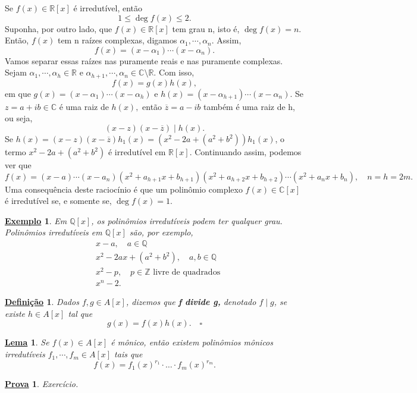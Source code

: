 \documentclass{article}
\newtheorem*{def*}{\underline{Defini\c c\~ao}}
\newtheorem*{lemma*}{\underline{Lema}}
\newtheorem{example}{\underline{Exemplo}}
\newtheorem*{proof*}{\underline{Prova}}
\begin{document}
Se \(f(x)\in \mathbb{R}[x]\) é irredutível, então 
\[
  1\leq \deg{f(x)}\leq 2.
\]
Suponha, por outro lado, que \(f(x)\in \mathbb{R}[x]\) tem grau n, isto é, \(\deg{f(x)} = n.\) Então, \(f(x)\) tem n raízes complexas,
digamos \(\alpha_{1}, \cdots, \alpha_{n}\). Assim, 
\[
  f(x) = (x-\alpha_{1})\cdots(x-\alpha_{n}).
\]
Vamos separar essas raízes nas puramente reais e nas puramente complexas. Sejam \(\alpha_{1}, \cdots, \alpha_{h}\in \mathbb{R}\) e
\(\alpha_{h+1}, \cdots, \alpha_{n}\in \mathbb{C}\setminus{\mathbb{R}}.\) Com isso, 
\[
  f(x) = g(x)h(x),
\]
em que \(g(x) = (x-\alpha_{1})\cdots(x-\alpha_{h})\) e \(h(x) = (x-\alpha_{h+1})\cdots(x-\alpha_{n}).\)
Se \(z = a + ib\in \mathbb{C}\) é uma raiz de \(h(x),\) então \(\overline{z} = a - ib\) também é uma raiz de h, ou seja, 
\[
  (x-z)(x-\overline{z})\mid h(x).
\]
Se \(h(x) = (x-z)(x-\overline{z})h_{1}(x) = (x^{2}-2a + (a^{2}+b^{2}))h_{1}(x)\), o termo 
\(x^{2}-2a + (a^{2}+b^{2})\) é irredutível em \(\mathbb{R}[x]\). Continuando assim, podemos ver que 
\[
  f(x) = (x-a)\cdots(x-a_{n})(x^{2}+a_{h+1}x + b_{h+1})(x^{2}+a_{h+2}x+b_{h+2})\cdots(x^{2}+a_{n}x + b_{n}),\quad n = h = 2m.
\]
Uma consequência deste raciocínio é que um polinômio complexo \(f(x)\in \mathbb{C}[x]\) é irredutível se, e somente se, \(\deg{f(x)} = 1.\)
\begin{example}
  Em \(\mathbb{Q}[x]\), os polinômios irredutíveis podem ter qualquer grau. Polinômios irredutíveis em \(\mathbb{Q}[x]\)
  são, por exemplo, 
  \begin{align*}
  &x-a,\quad a\in \mathbb{Q}\\
  &x^{2}-2ax + (a^{2}+b^{2}),\quad a, b\in \mathbb{Q}\\
  &x^{2} - p,\quad p\in \mathbb{Z}\text{ livre de quadrados}\\
  &x^{n} - 2.
  \end{align*}
\end{example}
\begin{def*}
  Dados \(f, g\in A[x]\), dizemos que \textbf{f divide g,} denotado \(f\mid g\), se existe \(h\in A[x]\) tal que 
  \[
    g(x) = f(x)h(x).\quad\square
  \]
\end{def*}
\begin{lemma*}
  Se \(f(x)\in A[x]\) é mônico, então existem polinômios mônicos irredutíveis \(f_{1}, \cdots, f_{m}\in A[x]\) tais que 
  \[
    f(x) = f_{1}(x)^{r_{1}}\cdot \dotsc \cdot f_{m}(x)^{r_{m}}.
  \]
\end{lemma*}
\begin{proof*}
  Exercício.
\end{proof*}
\end{document}
